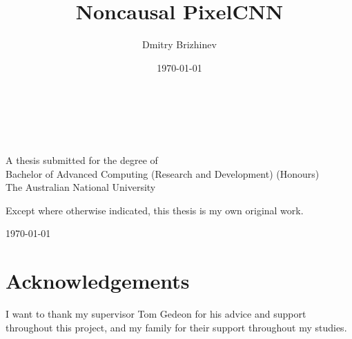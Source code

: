 \documentclass[11pt, a4paper, openany]{book}
\title{Noncausal PixelCNN}
\author{Dmitry Brizhinev}
\date{\today}
\begin{document}
\pagestyle{empty}
\thispagestyle{empty}

\begin{titlepage}
  \enlargethispage{2cm}
  \begin{center}
    \makeatletter
    \Huge\textbf{\@title} \\[.4cm]
    \Huge\textbf{\thesisqualifier} \\[2.5cm]
    \huge\textbf{\@author} \\[9cm]
    \makeatother
    \LARGE A thesis submitted for the degree of \\
    Bachelor of Advanced Computing (Research and Development) (Honours) \\
    The Australian National University \\[2cm]
    \thismonth
  \end{center}
\end{titlepage}


\vspace*{7cm}
\begin{center}
  Except where otherwise indicated, this thesis is my own original
  work.
\end{center}

\vspace*{4cm}

\hspace{8cm}\makeatletter\@author\makeatother\par
\hspace{8cm}\today

\cleardoublepage
\pagestyle{empty}
\chapter*{Acknowledgements}
I want to thank my supervisor Tom Gedeon for his advice and support throughout this project, and my family for their support throughout my studies.


\pagestyle{headings}
\end{document}
